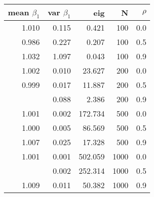 
\begin{tabular}{rrrrr}
\toprule
mean $\beta_1$ & var $\beta_1$ & eig & N & $\rho$\\
\midrule
1.010 & 0.115 & 0.421 & 100 & 0.0\\
0.986 & 0.227 & 0.207 & 100 & 0.5\\
1.032 & 1.097 & 0.043 & 100 & 0.9\\
1.002 & 0.010 & 23.627 & 200 & 0.0\\
0.999 & 0.017 & 11.887 & 200 & 0.5\\
\addlinespace
0.991 & 0.088 & 2.386 & 200 & 0.9\\
1.001 & 0.002 & 172.734 & 500 & 0.0\\
1.000 & 0.005 & 86.569 & 500 & 0.5\\
1.007 & 0.025 & 17.328 & 500 & 0.9\\
1.001 & 0.001 & 502.059 & 1000 & 0.0\\
\addlinespace
1.001 & 0.002 & 252.314 & 1000 & 0.5\\
1.009 & 0.011 & 50.382 & 1000 & 0.9\\
\bottomrule
\end{tabular}
